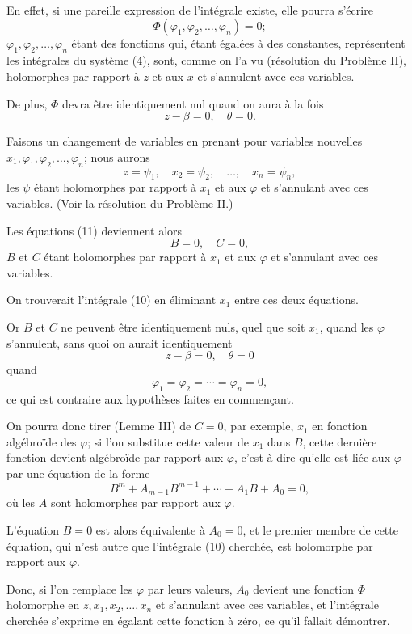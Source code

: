 \documentclass[11pt]{article}
\begin{document}
En effet, si une pareille expression de l’intégrale existe, elle pourra s’écrire
\begin{equation*}\tag{10}
\Phi(\varphi_1,\varphi_2,\ldots,\varphi_n)=0;
\end{equation*}
$\varphi_1,\varphi_2,\ldots,\varphi_n$ étant des fonctions qui, étant égalées à des constantes, représentent les intégrales du système (4), sont, comme on l’a vu (résolution du Problème II), holomorphes par rapport à $z$ et aux $x$ et s’annulent avec ces variables.

De plus, $\Phi$ devra être identiquement nul quand on aura à la fois
\begin{equation*}\tag{11}
z-\beta=0,\quad \theta=0.
\end{equation*}

Faisons un changement de variables en prenant pour variables nouvelles $x_1,\varphi_1,\varphi_2,\ldots,\varphi_n$; nous aurons
\begin{equation*}\tag{6}
z=\psi_1,
\quad x_2=\psi_2,
\quad \ldots,
\quad x_n=\psi_n,
\end{equation*}
les $\psi$ étant holomorphes par rapport à $x_1$ et aux $\varphi$ et s’annulant avec ces variables. (Voir la résolution du Problème II.)

Les équations (11) deviennent alors
\[
B=0,\quad C=0,
\]
$B$ et $C$ étant holomorphes par rapport à $x_1$ et aux $\varphi$ et s’annulant avec ces variables.

On trouverait l’intégrale (10) en éliminant $x_1$ entre ces deux équations.

Or $B$ et $C$ ne peuvent être identiquement nuls, quel que soit $x_1$, quand les $\varphi$ s’annulent, sans quoi on aurait identiquement
\[
z-\beta=0,\quad \theta=0
\]
quand
\[
\varphi_1=\varphi_2=\cdots=\varphi_n=0,
\]
ce qui est contraire aux hypothèses faites en commençant.

On pourra donc tirer (Lemme III) de $C=0$, par exemple, $x_1$ en fonction algébroïde des $\varphi$; si l’on substitue cette valeur de $x_1$ dans $B$, cette dernière fonction devient algébroïde par rapport aux $\varphi$, c’est-à-dire qu’elle est liée aux $\varphi$ par une équation de la forme
\[
B^m+A_{m-1}B^{m-1}+\cdots+A_1B+A_0=0,
\]
où les $A$ sont holomorphes par rapport aux $\varphi$.

L’équation $B=0$ est alors équivalente à $A_0=0$, et le premier membre de cette équation, qui n’est autre que l’intégrale (10) cherchée, est holomorphe par rapport aux $\varphi$.

Donc, si l’on remplace les $\varphi$ par leurs valeurs, $A_0$ devient une fonction $\Phi$ holomorphe en $z,x_1,x_2,\ldots,x_n$ et s’annulant avec ces variables, et l’intégrale cherchée s’exprime en égalant cette fonction à zéro, ce qu’il fallait démontrer.
\end{document}
